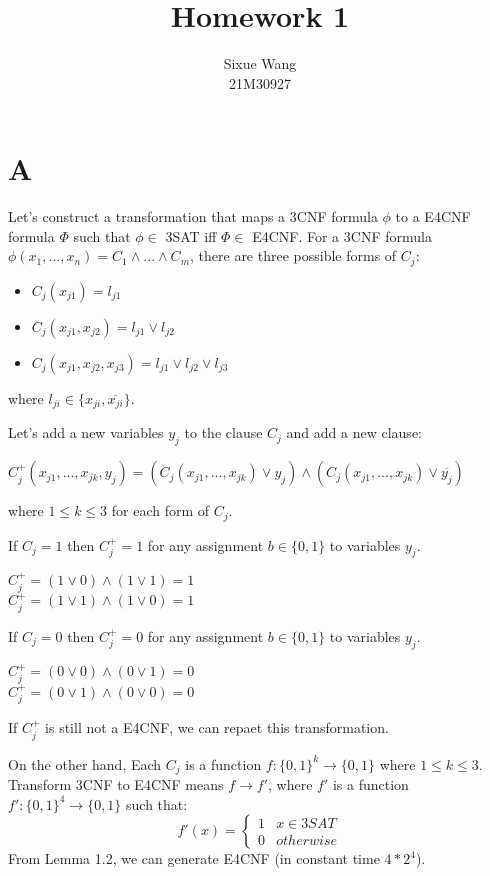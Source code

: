 \documentclass{article}
\title{Homework 1}
\author{Sixue Wang\\21M30927}
\begin{document}
\maketitle

\section*{A}

Let's construct a transformation that maps a 3CNF formula $\phi$ to a E4CNF formula $\Phi$ such that $\phi \in $ 3SAT iff $\Phi \in$ E4CNF.
For a 3CNF formula $\phi(x_1,...,x_n) = C_1 \wedge ... \wedge C_m$, there are three possible forms of $C_j$:
\begin{itemize}
  \item $C_j(x_{j1}) = l_{j1}$
  \item $C_j(x_{j1}, x_{j2}) = l_{j1} \vee l_{j2}$
  \item $C_j(x_{j1}, x_{j2}, x_{j3}) = l_{j1} \vee l_{j2} \vee l_{j3}$
\end{itemize}
where $l_{ji} \in \{x_{ji}, \overline{x_{ji}}\}$.

Let's add a new variables $y_j$ to the clause $C_j$ and add a new clause:

\begin{center}
  $C^+_j(x_{j1},...,x_{jk},y_j) = (C_j(x_{j1},...,x_{jk}) \vee y_j) \wedge (C_j(x_{j1},...,x_{jk}) \vee \overline{y_j})$
\end{center}

where $1 \leq k \leq 3$ for each form of $C_j$.

If $C_j = 1$ then $C^+_j = 1$ for any assignment $b \in \{0,1\}$ to variables $y_j$.
\begin{center}
  $C^+_j = (1 \vee 0) \wedge (1 \vee 1) = 1$ \\
  $C^+_j = (1 \vee 1) \wedge (1 \vee 0) = 1$ \\
\end{center}

If $C_j = 0$ then $C^+_j = 0$ for any assignment $b \in \{0,1\}$ to variables $y_j$.
\begin{center}
  $C^+_j = (0 \vee 0) \wedge (0 \vee 1) = 0$ \\
  $C^+_j = (0 \vee 1) \wedge (0 \vee 0) = 0$ \\
\end{center}

If $C^+_j$ is still not a E4CNF, we can repaet this transformation.

On the other hand, Each $C_j$ is a function $f: \{0,1\}^k \rightarrow \{0, 1\}$ where $1 \leq k \leq 3$.
Transform 3CNF to E4CNF means $f \rightarrow f'$, where $f'$ is a function $f': \{0, 1\}^4 \rightarrow \{0, 1\}$ such that:
\begin{equation*}
  f'(x) = \begin{cases}
          1 & x \in 3SAT \\
          0 & otherwise
        \end{cases}
\end{equation*}
From Lemma 1.2, we can generate E4CNF (in constant time $4*2^4$).
\end{document}
